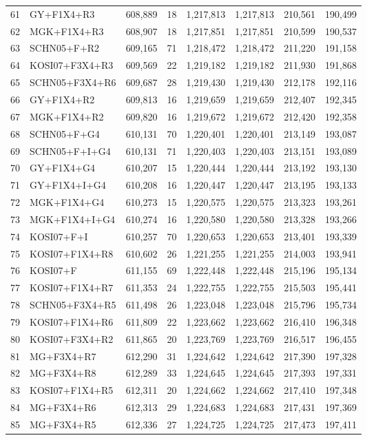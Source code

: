 \begin{longtable}{rlrrrrrr}
61&GY+F1X4+R3&608,889&18&1,217,813&1,217,813&210,561&190,499\\
62&MGK+F1X4+R3&608,907&18&1,217,851&1,217,851&210,599&190,537\\
63&SCHN05+F+R2&609,165&71&1,218,472&1,218,472&211,220&191,158\\
64&KOSI07+F3X4+R3&609,569&22&1,219,182&1,219,182&211,930&191,868\\
65&SCHN05+F3X4+R6&609,687&28&1,219,430&1,219,430&212,178&192,116\\
66&GY+F1X4+R2&609,813&16&1,219,659&1,219,659&212,407&192,345\\
67&MGK+F1X4+R2&609,820&16&1,219,672&1,219,672&212,420&192,358\\
68&SCHN05+F+G4&610,131&70&1,220,401&1,220,401&213,149&193,087\\
69&SCHN05+F+I+G4&610,131&71&1,220,403&1,220,403&213,151&193,089\\
70&GY+F1X4+G4&610,207&15&1,220,444&1,220,444&213,192&193,130\\
71&GY+F1X4+I+G4&610,208&16&1,220,447&1,220,447&213,195&193,133\\
72&MGK+F1X4+G4&610,273&15&1,220,575&1,220,575&213,323&193,261\\
73&MGK+F1X4+I+G4&610,274&16&1,220,580&1,220,580&213,328&193,266\\
74&KOSI07+F+I&610,257&70&1,220,653&1,220,653&213,401&193,339\\
75&KOSI07+F1X4+R8&610,602&26&1,221,255&1,221,255&214,003&193,941\\
76&KOSI07+F&611,155&69&1,222,448&1,222,448&215,196&195,134\\
77&KOSI07+F1X4+R7&611,353&24&1,222,755&1,222,755&215,503&195,441\\
78&SCHN05+F3X4+R5&611,498&26&1,223,048&1,223,048&215,796&195,734\\
79&KOSI07+F1X4+R6&611,809&22&1,223,662&1,223,662&216,410&196,348\\
80&KOSI07+F3X4+R2&611,865&20&1,223,769&1,223,769&216,517&196,455\\
81&MG+F3X4+R7&612,290&31&1,224,642&1,224,642&217,390&197,328\\
82&MG+F3X4+R8&612,289&33&1,224,645&1,224,645&217,393&197,331\\
83&KOSI07+F1X4+R5&612,311&20&1,224,662&1,224,662&217,410&197,348\\
84&MG+F3X4+R6&612,313&29&1,224,683&1,224,683&217,431&197,369\\
85&MG+F3X4+R5&612,336&27&1,224,725&1,224,725&217,473&197,411\\

\end{longtable}
